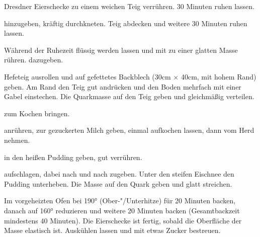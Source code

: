 \begin{recipe}{Dresdner Eierschecke}
  zu einem weichen Teig verrühren. 30 Minuten ruhen lassen.

  hinzugeben, kräftig durchkneten. Teig abdecken und weitere 30 Minuten
  ruhen lassen.

  Während der Ruhezeit
  flüssig werden lassen und mit
  zu einer glatten Masse rühren.
  dazugeben.

  Hefeteig ausrollen und auf gefettetes Backblech (30cm $\times$ 40cm, mit hohem
  Rand) geben. Am Rand den Teig gut andrücken und den Boden mehrfach mit
  einer Gabel einstechen. Die Quarkmasse auf den Teig geben und
  gleichmäßig verteilen.
  
  zum Kochen bringen.

  anrühren, zur gezuckerten Milch geben, einmal aufkochen lassen, dann
  vom Herd nehmen.
  
  in den heißen Pudding geben, gut verrühren.
  
  aufschlagen, dabei nach und nach
  zugeben. Unter den steifen Eischnee den Pudding unterheben. Die Masse
  auf den Quark geben und glatt streichen.

  Im vorgeheizten Ofen bei 190° (Ober-"/Unterhitze) für 20 Minuten
  backen, danach auf 160° reduzieren und weitere 20 Minuten backen
  (Gesamtbackzeit mindestens 40 Minuten). Die Eierschecke ist fertig,
  sobald die Oberfläche der Masse elastisch ist. Auskühlen lassen und
  mit etwas Zucker bestreuen.
  
\end{recipe}



